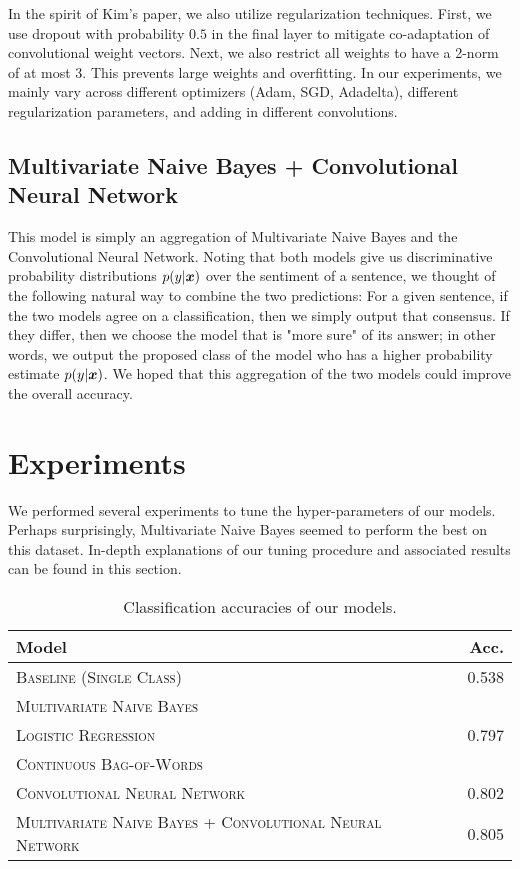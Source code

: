 \documentclass[11pt]{article}
\begin{document}
In the spirit of Kim's paper, we also utilize regularization techniques.  First, we use dropout with probability $0.5$ in the final layer to mitigate co-adaptation of convolutional weight vectors.  Next, we also restrict all weights to have a 2-norm of at most 3.  This prevents large weights and overfitting.  In our experiments, we mainly vary across different optimizers (Adam, SGD, Adadelta), different regularization parameters, and adding in different convolutions.  

\subsection{Multivariate Naive Bayes + Convolutional Neural Network}

This model is simply an aggregation of Multivariate Naive Bayes and the Convolutional Neural Network.  Noting that both models give us discriminative probability distributions $p(y \vert \boldsymbol{x})$ over the sentiment of a sentence, we thought of the following natural way to combine the two predictions: For a given sentence, if the two models agree on a classification, then we simply output that consensus.  If they differ, then we choose the model that is "more sure" of its answer; in other words, we output the proposed class of the model who has a higher probability estimate $p(y \vert \boldsymbol{x})$.  We hoped that this aggregation of the two models could improve the overall accuracy.   
\section{Experiments}

We performed several experiments to tune the hyper-parameters of our models.  Perhaps surprisingly, Multivariate Naive Bayes seemed to perform the best on this dataset.  In-depth explanations of our tuning procedure and associated results can be found in this section.

\begin{table}[H]
\centering
\begin{tabular}{llr}
 \toprule
 Model &  & Acc. \\
 \midrule
 \textsc{Baseline (Single Class)} & & 0.538\\
 \textsc{Multivariate Naive Bayes} & &  \\
 \textsc{Logistic Regression} & & 0.797  \\
 \textsc{Continuous Bag-of-Words} & & \\
 \textsc{Convolutional Neural Network} & & 0.802 \\
 \textsc{Multivariate Naive Bayes + Convolutional Neural Network}  & & 0.805 \\
 \bottomrule 
\end{tabular}
\caption{\label{tab:results} Classification accuracies of our models.}
\end{table}
\end{document}

